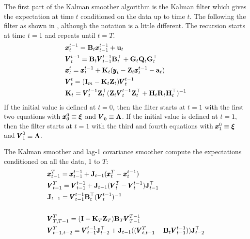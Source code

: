 \documentclass[]{article}
\def\xixi{\mbox{\boldmath $\xi$}}
\def\LAM{\mbox{\boldmath $\Lambda$}}
\def\ZZ{\mbox{$\mathbf Z$}}	\def\zz{\mbox{$\mathbf z$}}
\def\BB{\mbox{$\mathbf B$}}	\def\bb{\mbox{$\mathbf b$}}
\def\GG{\mbox{$\mathbf G$}}	\def\gg{\mbox{$\mathbf g$}}
\def\HH{\mbox{$\mathbf H$}}	\def\hh{\mbox{$\mathbf h$}}
\def\II{\mbox{$\mathbf I$}} \def\ii{\mbox{$\mathbf i$}}
\def\JJ{\mbox{$\mathbf J$}}
\def\KK{\mbox{$\mathbf K$}}
\def\QQ{\mbox{$\mathbf Q$}}	 \def\qq{\mbox{$\mathbf q$}}
\def\RR{\mbox{$\mathbf R$}}	 \def\rr{\mbox{$\mathbf r$}}
\def\VV{\mbox{$\pmb{V}$}}	\def\vv{\mbox{$\pmb{v}$}}
\begin{document}
The first part of the Kalman smoother algorithm is the Kalman filter which gives the expectation at time $t$ conditioned on the data up to time $t$.  The following the filter as shown in \citep[section 6.2, p. 331]{ShumwayStoffer2006}, although the notation is a little different. The recursion starts at time $t=1$ and repeats until $t=T$.
\begin{subequations}\label{eq:kffilter}
\begin{align}
&\xx_t^{t-1}=\BB_t\xx_{t-1}^{t-1}+\uu_t\label{eq:xtt1}\\
&\VV_t^{t-1}=\BB_t\VV_{t-1}^{t-1}\BB_t^\top + \GG_t\QQ_t\GG_t^\top\label{eq:Vtt1}\\
&\xx_t^t=\xx_t^{t-1}+\KK_t(\yy_t-\ZZ_t\xx_t^{t-1}-\aa_t)\label{eq:xtt}\\
&\VV_t^t=(\II_m-\KK_t\ZZ_t)\VV_t^{t-1}\label{eq:Vtt}\\
&\KK_t=\VV_t^{t-1}\ZZ_t^\top(\ZZ_t\VV_t^{t-1}\ZZ_t^\top+\HH_t\RR_t\HH_t^\top)^{-1}\label{eq:Kt}
\end{align}
\end{subequations}
If the initial value is defined at $t=0$, then the filter starts at $t=1$ with the first two equations with $\xx_{0}^{0} \equiv \xixi$ and $\VV_{0}^{}\equiv\LAM$. If the initial value is defined at $t=1$, then the filter starts at $t=1$ with the third and fourth equations with $\xx_{1}^{0}\equiv\xixi$ and $\VV_{1}^{0}\equiv\LAM$.


The Kalman smoother and lag-1 covariance smoother compute the expectations conditioned on all the data, 1 to $T$:
\begin{subequations}\label{eq:kfsmoother}
\begin{align}
&\xx_{t-1}^T=\xx_{t-1}^{t-1}+\JJ_{t-1}(\xx_t^T-\xx_t^{t-1})\label{eq:xt1T}\\
&\VV_{t-1}^T=\VV_{t-1}^{t-1}+\JJ_{t-1}(\VV_t^T-\VV_t^{t-1})\JJ_{t-1}^\top\label{eq:Vt1T}\\
&\JJ_{t-1}=\VV_{t-1}^{t-1}\BB_t^\top(\VV_t^{t-1})^{-1}\label{eq:Jt}\\
\\
&\VV_{T,T-1}^T=(\II-\KK_T\ZZ_T)\BB_T\VV_{T-1}^{T-1}\label{eq:VTT1T}\\
&\VV_{t-1,t-2}^T=\VV_{t-1}^{t-1}\JJ_{t-2}^\top + \JJ_{t-1}((\VV_{t,t-1}^T-\BB_t\VV_{t-1}^{t-1}))\JJ_{t-2}^\top\label{eq:Vtt1T}
\end{align}
\end{subequations}
\end{document}
